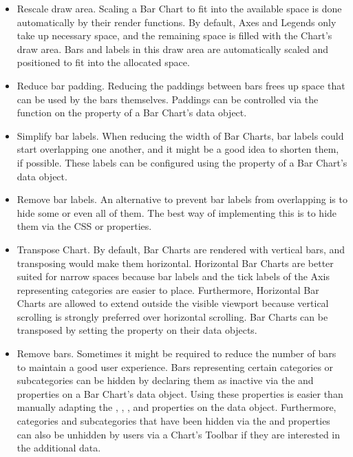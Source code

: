 \begin{itemize}

\item
Rescale draw area.
Scaling a Bar Chart to fit into the available space is done automatically by their render functions.
By default, Axes and Legends only take up necessary space, and the remaining space is filled with the Chart's draw area.
Bars and labels in this draw area are automatically scaled and positioned to fit into the allocated space.

\item
Reduce bar padding.
Reducing the paddings between bars frees up space that can be used by the bars themselves.
Paddings can be controlled via the  function on the  property of a Bar Chart's data object. 

\item
Simplify bar labels.
When reducing the width of Bar Charts, bar labels could start overlapping one another, and it might be a good idea to shorten them, if possible. 
These labels can be configured using the  property of a Bar Chart's data object.

\item
Remove bar labels.
An alternative to prevent bar labels from overlapping is to hide some or even all of them.
The best way of implementing this is to hide them via the CSS  or  properties.

\item
Transpose Chart.
By default, Bar Charts are rendered with vertical bars, and transposing would make them horizontal.
Horizontal Bar Charts are better suited for narrow spaces because bar labels and the tick labels of the Axis representing categories are easier to place.
Furthermore, Horizontal Bar Charts are allowed to extend outside the visible viewport because vertical scrolling is strongly preferred over horizontal scrolling.
Bar Charts can be transposed by setting the  property on their data objects.

\item
Remove bars.
Sometimes it might be required to reduce the number of bars to maintain a good user experience.
Bars representing certain categories or subcategories can be hidden by declaring them as inactive via the  and  properties on a Bar Chart's data object.
Using these properties is easier than manually adapting the , , , and  properties on the data object.
Furthermore, categories and subcategories that have been hidden via the  and  properties can also be unhidden by users via a Chart's Toolbar if they are interested in the additional data.  


\end{itemize}
